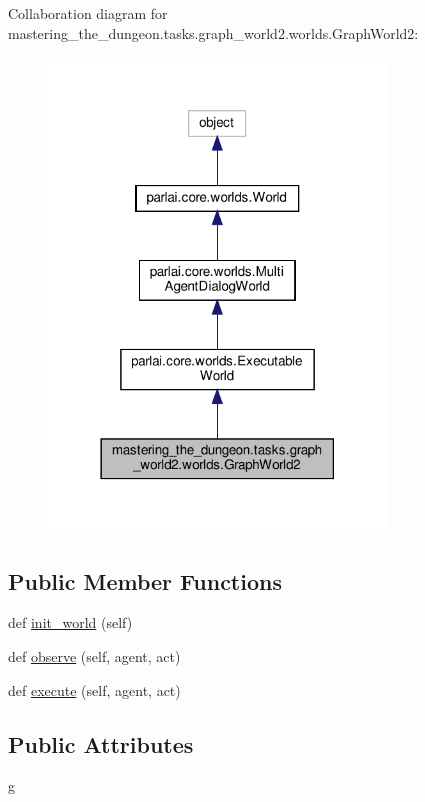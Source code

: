 Collaboration diagram for mastering\+\_\+the\+\_\+dungeon.\+tasks.\+graph\+\_\+world2.\+worlds.\+Graph\+World2\+:
\nopagebreak
\begin{figure}[H]
\begin{center}
\leavevmode
\includegraphics[width=254pt]{classmastering__the__dungeon_1_1tasks_1_1graph__world2_1_1worlds_1_1GraphWorld2__coll__graph}
\end{center}
\end{figure}
\subsection*{Public Member Functions}
\begin{DoxyCompactItemize}
\item 
def \hyperlink{classmastering__the__dungeon_1_1tasks_1_1graph__world2_1_1worlds_1_1GraphWorld2_aa8a4263d617d14b8c8d376e759488a1f}{init\+\_\+world} (self)
\item 
def \hyperlink{classmastering__the__dungeon_1_1tasks_1_1graph__world2_1_1worlds_1_1GraphWorld2_a29801fb34492a7b63fc13f7a99b81138}{observe} (self, agent, act)
\item 
def \hyperlink{classmastering__the__dungeon_1_1tasks_1_1graph__world2_1_1worlds_1_1GraphWorld2_a2995881e09872963c56459d74a28e95a}{execute} (self, agent, act)
\end{DoxyCompactItemize}
\subsection*{Public Attributes}
\begin{DoxyCompactItemize}
\item 
\hyperlink{classmastering__the__dungeon_1_1tasks_1_1graph__world2_1_1worlds_1_1GraphWorld2_a49d1eedc379ba9d7019bdd75f5499b44}{g}
\end{DoxyCompactItemize}



